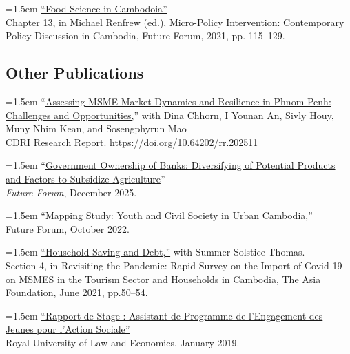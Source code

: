 \documentclass[10pt,a4paper]{article}
\begin{document}
\hangindent=1.5em
\href{https://kosalnith.github.io/research/policies/PolicyBrief-FST.pdf}{``Food Science in Cambodoia''} \\
Chapter 13, in Michael Renfrew (ed.), Micro-Policy Intervention: Contemporary Policy Discussion in Cambodia, Future Forum, 2021, pp. 115–129. 

\subsection*{Other Publications}

	\hangindent=1.5em
``\href{https://doi.org/10.64202/rr.202511}{Assessing MSME Market Dynamics and Resilience in Phnom Penh: Challenges and Opportunities,}'' with Dina Chhorn, I Younan An, Sivly Houy, Muny Nhim Kean, and Sosengphyrun Mao\\ 
CDRI Research Report. \url{https://doi.org/10.64202/rr.202511}  \\ \vspace{-.5em}

	\hangindent=1.5em
	“\href{https://kosalnith.github.io/research/papers/GOB.pdf}{Government Ownership of Banks: Diversifying of Potential Products and Factors to Subsidize Agriculture}” \\
	\textit{Future Forum}, December 2025. \\ \vspace{-.5em} 
	
		\hangindent=1.5em
	\href{}{``Mapping Study: Youth and Civil Society in Urban Cambodia,”} \\
	Future Forum, October 2022.\\ \vspace{-.5em} 
	
	\hangindent=1.5em
	\href{https://kosalnith.github.io/research/policies/COVID-19-HHSavingsDebt.pdf}{``Household Saving and Debt,”} with Summer-Solstice Thomas.\\
	Section 4, in Revisiting the Pandemic: Rapid Survey on the Import of Covid-19 on MSMES in the Tourism Sector and Households in Cambodia, The Asia Foundation, June 2021, pp.50--54.\\ \vspace{-.5em} 
			
	\hangindent=1.5em
	\href{https://www.researchgate.net/publication/330936932_Rapport_du_Stage_Assistant_de_Programme_a_l%27YRDP}{``Rapport de Stage : Assistant de Programme de l'Engagement des Jeunes pour l'Action Sociale”} \\
	Royal University of Law and Economics, January 2019. \\ \vspace{-.5em}
			
\end{document}
